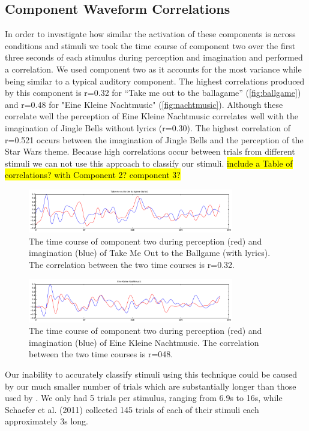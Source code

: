 \subsection*{Component Waveform Correlations}
In order to investigate how similar the activation of these components is across conditions and stimuli we took the time course of component two over the first three seconds of each stimulus during perception and imagination and performed a correlation.
We used component two as it accounts for the most variance while being similar to a typical auditory component.
The highest correlations produced by this component is r=0.32 for ``Take me out to the ballagame'' (\autoref{fig:ballgame}) and r=0.48 for "Eine Kleine Nachtmusic" (\autoref{fig:nachtmusic}).
Although these correlate well the perception of Eine Kleine Nachtmusic correlates well with the imagination of Jingle Bells without lyrics (r=0.30). 
The highest correlation of r=0.521 occurs between the imagination of Jingle Bells and the perception of the Star Wars theme. 
Because high correlations occur between trials from different stimuli we can not use this approach to classify our stimuli.
\hl{include a Table of correlations? with Component 2? component 3?}

\begin{figure}[t]
  \begin{center}
    \includegraphics[width=0.8\textwidth,keepaspectratio=true]{Figures/component_timecourse_ballgame.pdf}
    \caption{
The time course of component two during perception (red) and imagination (blue) of Take Me Out to the Ballgame (with lyrics). The correlation between the two time courses is r=0.32.
}
    \label{fig:ballgame}
  \end{center}
\end{figure}

\begin{figure}[t]
  \begin{center}
    \includegraphics[width=0.8\textwidth,keepaspectratio=true]{Figures/component_timecourse_nachtmusic.pdf}
    \caption{
The time course of component two during perception (red) and imagination (blue) of Eine Kleine Nachtmusic. The correlation between the two time courses is r=048.
}
    \label{fig:nachtmusic}
  \end{center}
\end{figure}

Our inability to accurately classify stimuli using this technique could be caused by our much smaller number of trials which are substantially longer than those used by \cite{schaefer_name_2011}. 
We only had 5 trials per stimulus, ranging from 6.9s to 16s, while Schaefer et al. (2011) collected 145 trials of each of their stimuli each approximately 3s long.